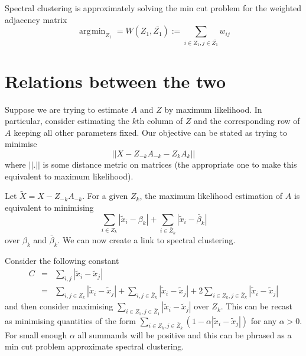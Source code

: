 \documentclass{article}
\numberwithin{equation}{section}
\numberwithin{thm}{section}
\def\IBP{Z}
\def\Weights{A}
\def\Data{X}
\DeclareMathOperator*{\argmin}{\arg\!\min}
\begin{document}
Spectral clustering is approximately solving the min cut problem for the weighted adjacency matrix \ie
\begin{equation}
\argmin_{\IBP_1} = W(\IBP_1, \bar{\IBP_1}) := \sum_{i \in \IBP_1, j \in \bar{\IBP_1}}w_{ij}
\end{equation}

\section{Relations between the two}

Suppose we are trying to estimate $\Weights$ and $\IBP$ by maximum likelihood.
In particular, consider estimating the $k$th column of $\IBP$ and the corresponding row of $\Weights$ keeping all other parameters fixed.
Our objective can be stated as trying to minimise
\begin{equation}
||\Data - \IBP_{-k}\Weights_{-k} - \IBP_{k}\Weights_{k}||
\end{equation}
where $||.||$ is some distance metric on matrices (\ie the appropriate one to make this equivalent to maximum likelihood).

Let $\tilde X = \Data - \IBP_{-k}\Weights_{-k}$.
For a given $\IBP_k$, the maximum likelihood estimation of $\Weights$ is equivalent to minimising
\begin{equation}
\sum_{i \in \IBP_k}|\tilde x_i - \beta_k| + \sum_{i \in \bar\IBP_k}|\tilde x_i - \bar\beta_k|
\end{equation}
over $\beta_k$ and $\bar\beta_k$.
We can now create a link to spectral clustering.

Consider the following constant
\begin{eqnarray}
C & = & \sum_{i,j}|\tilde x_i - \tilde x_j| \\
  & = & \sum_{i,j \in \IBP_k}|\tilde x_i - \tilde x_j| + \sum_{i,j \in \bar\IBP_k}|\tilde x_i - \tilde x_j| + 2\sum_{i \in \IBP_k, j \in \bar\IBP_k}|\tilde x_i - \tilde x_j|
\end{eqnarray}
and then consider maximising $\sum_{i \in \IBP_1, j \in \bar\IBP_1}|\tilde x_i - \tilde x_j|$ over $\IBP_k$.
This can be recast as minimising quantities of the form $\sum_{i \in \IBP_k, j \in \bar\IBP_k}(1 - \alpha|\tilde x_i - \tilde x_j|)$ for any $\alpha > 0$.
For small enough $\alpha$ all summands will be positive and this can be phrased as a min cut problem \ie approximate spectral clustering.
\end{document}
